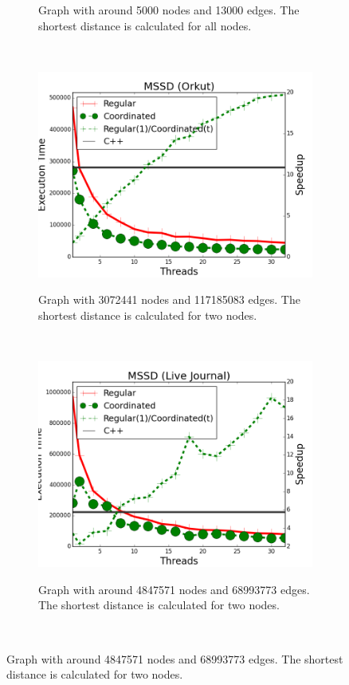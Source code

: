 \begin{figure}[]
\begin{subfigure}[b]{\plotsize\textwidth}
                \label{fig:coordination:coord_unbuffered_sssp_uspowergrid}
                \caption{Graph with around 5000 nodes and 13000 edges. The
                shortest distance is calculated for all nodes.}
        \end{subfigure}\\
        \begin{subfigure}[b]{\plotsize\textwidth}
                \includegraphics[width=\textwidth]{experiments/coordination/unbuffered-shortest-orkut.png}
                \label{fig:coordination:coord_unbuffered_sssp_orkut}
                \caption{Graph with 3072441 nodes and 117185083 edges. The shortest
                   distance is calculated for two nodes.}
        \end{subfigure}
        ~
        \begin{subfigure}[b]{\plotsize\textwidth}
                \includegraphics[width=\textwidth]{experiments/coordination/unbuffered-shortest-livejournal.png}
                \label{fig:coordination:coord_unbuffered_sssp_livejournal}
                \caption{Graph with around 4847571 nodes and 68993773 edges. The
                shortest distance is calculated for two nodes.}
        \end{subfigure}\\


\end{figure}
